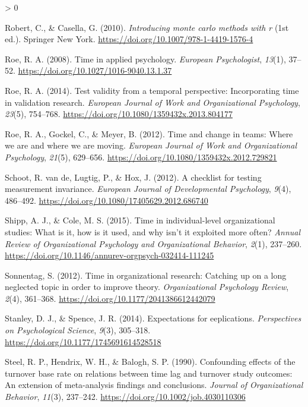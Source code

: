 \documentclass[
12pt, %
twoside,
english]{guelphthesis}
\newlength{\cslhangindent}
\newenvironment{CSLReferences}[2] %
 {%
  \setlength{\parindent}{0pt}
  \ifodd #1 \everypar{\setlength{\hangindent}{\cslhangindent}}\ignorespaces\fi
  \ifnum #2 > 0
  \setlength{\parskip}{\linespacing{2}}
  \fi
 }%
 {}
\begin{document}
\begin{CSLReferences}{1}{0}
\leavevmode{}%
Robert, C., \& Casella, G. (2010). \emph{Introducing monte carlo methods with r} (1st ed.). Springer New York. \url{https://doi.org/10.1007/978-1-4419-1576-4}

\leavevmode{}%
Roe, R. A. (2008). Time in applied psychology. \emph{European Psychologist}, \emph{13}(1), 37--52. \url{https://doi.org/10.1027/1016-9040.13.1.37}

\leavevmode{}%
Roe, R. A. (2014). Test validity from a temporal perspective: Incorporating time in validation research. \emph{European Journal of Work and Organizational Psychology}, \emph{23}(5), 754--768. \url{https://doi.org/10.1080/1359432x.2013.804177}

\leavevmode{}%
Roe, R. A., Gockel, C., \& Meyer, B. (2012). Time and change in teams: Where we are and where we are moving. \emph{European Journal of Work and Organizational Psychology}, \emph{21}(5), 629--656. \url{https://doi.org/10.1080/1359432x.2012.729821}

\leavevmode{}%
Schoot, R. van de, Lugtig, P., \& Hox, J. (2012). A checklist for testing measurement invariance. \emph{European Journal of Developmental Psychology}, \emph{9}(4), 486--492. \url{https://doi.org/10.1080/17405629.2012.686740}

\leavevmode{}%
Shipp, A. J., \& Cole, M. S. (2015). Time in individual-level organizational studies: What is it, how is it used, and why isn{'}t it exploited more often? \emph{Annual Review of Organizational Psychology and Organizational Behavior}, \emph{2}(1), 237--260. \url{https://doi.org/10.1146/annurev-orgpsych-032414-111245}

\leavevmode{}%
Sonnentag, S. (2012). Time in organizational research: Catching up on a long neglected topic in order to improve theory. \emph{Organizational Psychology Review}, \emph{2}(4), 361--368. \url{https://doi.org/10.1177/2041386612442079}

\leavevmode{}%
Stanley, D. J., \& Spence, J. R. (2014). Expectations for eeplications. \emph{Perspectives on Psychological Science}, \emph{9}(3), 305--318. \url{https://doi.org/10.1177/1745691614528518}

\leavevmode{}%
Steel, R. P., Hendrix, W. H., \& Balogh, S. P. (1990). Confounding effects of the turnover base rate on relations between time lag and turnover study outcomes: An extension of meta-analysis findings and conclusions. \emph{Journal of Organizational Behavior}, \emph{11}(3), 237--242. \url{https://doi.org/10.1002/job.4030110306}


\end{CSLReferences}
\end{document}
